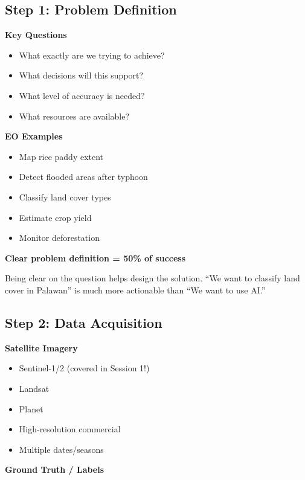 \documentclass[
  letterpaper,
  DIV=11,
  numbers=noendperiod]{scrartcl}
\providecommand{\tightlist}{%
  \setlength{\itemsep}{0pt}\setlength{\parskip}{0pt}}
\begin{document}
\subsection{Step 1: Problem Definition}\label{step-1-problem-definition}

\textbf{Key Questions}

\begin{itemize}
\tightlist
\item
  What exactly are we trying to achieve?
\item
  What decisions will this support?
\item
  What level of accuracy is needed?
\item
  What resources are available?
\end{itemize}

\textbf{EO Examples}

\begin{itemize}
\tightlist
\item
  Map rice paddy extent
\item
  Detect flooded areas after typhoon
\item
  Classify land cover types
\item
  Estimate crop yield
\item
  Monitor deforestation
\end{itemize}

\textbf{Clear problem definition = 50\% of success}

Being clear on the question helps design the solution. ``We want to
classify land cover in Palawan'' is much more actionable than ``We want
to use AI.''

\subsection{Step 2: Data Acquisition}\label{step-2-data-acquisition}

\textbf{Satellite Imagery}

\begin{itemize}
\tightlist
\item
  Sentinel-1/2 (covered in Session 1!)
\item
  Landsat
\item
  Planet
\item
  High-resolution commercial
\item
  Multiple dates/seasons
\end{itemize}

\textbf{Ground Truth / Labels}
\end{document}
